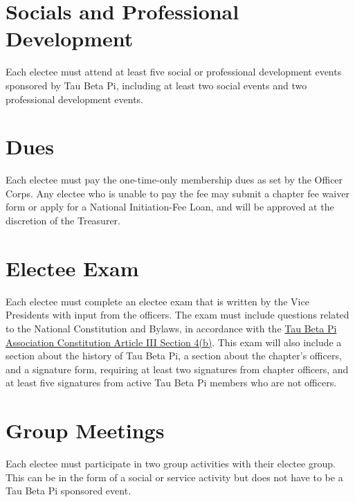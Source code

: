 \section{Socials and Professional Development}\label{sec:ugsocialreq} \label{sec:ugpdreq}
Each electee must attend at least five social or professional development events sponsored by Tau Beta Pi, including at least two social events and two professional development events.
\section{Dues}
Each electee must pay the one-time-only membership dues as set by the Officer Corps. 
Any electee who is unable to pay the fee may submit a chapter fee waiver form or apply for a National Initiation-Fee Loan, and will be approved at the discretion of the Treasurer.
\section{Electee Exam}
Each electee must complete an electee exam that is written by the Vice Presidents with input from the officers. 
The exam must include questions related to the National Constitution and Bylaws, 
in accordance with the \href{http://www.tbp.org/off/ConstBylaw.pdf}{Tau Beta Pi Association Constitution Article III Section 4(b)}. 
This exam will also include a section about the history of Tau Beta Pi, a section about the chapter’s officers, and a signature form, 
requiring at least two signatures from chapter officers, and at least five signatures from active Tau Beta Pi members who are not officers.
\section{Group Meetings}
\label{group_meetings} Each electee must participate in two group activities with their electee group. 
This can be in the form of a social or service activity but does not have to be a Tau Beta Pi sponsored event.
